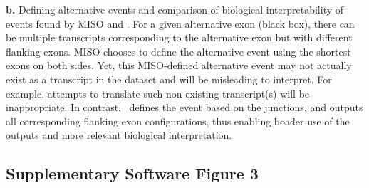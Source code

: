 \begin{minipage}{\textwidth}
{\textbf{b.} Defining alternative events and comparison of biological interpretability of events found by MISO and \outrigger. For a given alternative exon (black box), there can be multiple transcripts corresponding to the alternative exon but with different flanking exons. MISO chooses to define the alternative event using the shortest exons on both sides. Yet, this MISO-defined alternative event may not actually exist as a transcript in the dataset and will be misleading to interpret. For example, attempts to translate such non-existing transcript(s) will be inappropriate. In contrast, \outrigger\, defines the event based on the junctions, and outputs all corresponding flanking exon configurations, thus enabling boader use of the outputs and more relevant biological interpretation. 
}
\label{fig:outrigger_index}
\end{minipage}




\subsection{Supplementary Software Figure 3}

